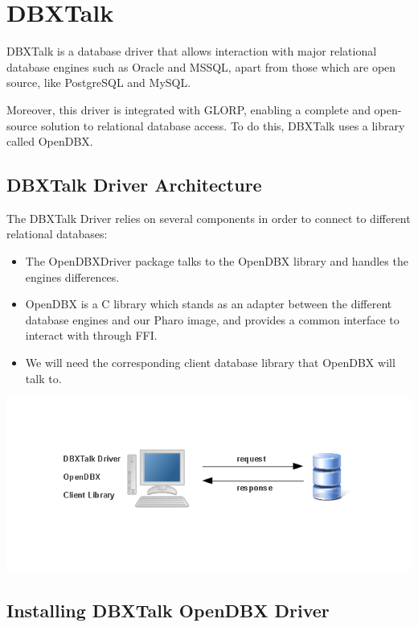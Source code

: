 \documentclass[a4paper,10pt,twoside]{book}
\begin{document}
\fi
\sloppy


\chapter{DBXTalk}
\chapterauthor{\authorguille{}}

DBXTalk is a database driver that allows interaction with major relational database engines such as
Oracle and MSSQL, apart from those which are open source, like PostgreSQL and MySQL.

Moreover, this driver is integrated with GLORP, enabling a complete and open-source
solution to relational database access.  To do this, DBXTalk uses a library called OpenDBX.
\section{DBXTalk Driver Architecture}
The DBXTalk Driver relies on several components in order to connect to different relational databases:
\begin{itemize}
\item The OpenDBXDriver package talks to the OpenDBX library and handles the engines differences.
\item OpenDBX is a C library which stands as an adapter between the different database engines 
and our Pharo image, and provides a common interface to interact with through FFI.
\item We will need the corresponding client database library that OpenDBX will talk to.
\end{itemize}
\includegraphics[width=\linewidth]{dbx_architecture.png}


\section{Installing DBXTalk OpenDBX Driver}
\end{document}
